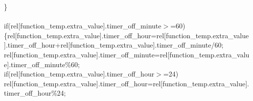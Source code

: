 \documentclass[a4paper, 12pt]{article}
\newcommand\SPC{\hspace*{0.6em}}
\newcommand{\CppAIdentifier}[1]{\textcolor[rgb]{0,1,0}{#1}}
\newcommand{\CppANumber}[1]{\textcolor[rgb]{0,0,1}{#1}}
\newcommand{\CppAReservedWord}[1]{\textcolor[rgb]{0,0.5,0}{#1}}
\newcommand{\CppASpace}[1]{\textcolor[rgb]{1,1,1}{\colorbox[rgb]{0,0,0}{#1}}}
\newcommand{\CppASymbol}[1]{\textcolor[rgb]{1,0,0}{#1}}
\begin{document}
\begin{ttfamily}
\CppASpace{\SPC \SPC }\CppASymbol{\}}\\
\\
\CppASpace{\SPC \SPC }\CppAReservedWord{if}\CppASymbol{(}\CppAIdentifier{rel}\CppASymbol{[}\CppAIdentifier{function\_temp}\CppASymbol{.}\CppAIdentifier{extra\_value}\CppASymbol{]}\CppASymbol{.}\CppAIdentifier{timer\_off\_minute}\CppASpace{\SPC }\CppASymbol{$>$=}\CppASpace{\SPC }\CppANumber{60}\CppASymbol{)}\\
\CppASpace{\SPC \SPC }\CppASymbol{\{}\CppASpace{\SPC }\CppAIdentifier{rel}\CppASymbol{[}\CppAIdentifier{function\_temp}\CppASymbol{.}\CppAIdentifier{extra\_value}\CppASymbol{]}\CppASymbol{.}\CppAIdentifier{timer\_off\_hour}\CppASpace{\SPC }\CppASymbol{=}\CppASpace{\SPC }\CppAIdentifier{rel}\CppASymbol{[}\CppAIdentifier{function\_temp}\CppASymbol{.}\CppAIdentifier{extra\_value}\CppASymbol{]}\CppASymbol{.}\CppAIdentifier{timer\_off\_hour}\CppASpace{\SPC }\CppASymbol{+}\CppASpace{\SPC }\CppAIdentifier{rel}\CppASymbol{[}\CppAIdentifier{function\_temp}\CppASymbol{.}\CppAIdentifier{extra\_value}\CppASymbol{]}\CppASymbol{.}\CppAIdentifier{timer\_off\_minute}\CppASpace{\SPC }\CppASymbol{/}\CppASpace{\SPC }\CppANumber{60}\CppASpace{\SPC }\CppASymbol{;}\\
\CppASpace{\SPC \SPC \SPC \SPC }\CppAIdentifier{rel}\CppASymbol{[}\CppAIdentifier{function\_temp}\CppASymbol{.}\CppAIdentifier{extra\_value}\CppASymbol{]}\CppASymbol{.}\CppAIdentifier{timer\_off\_minute}\CppASpace{\SPC }\CppASymbol{=}\CppASpace{\SPC }\CppAIdentifier{rel}\CppASymbol{[}\CppAIdentifier{function\_temp}\CppASymbol{.}\CppAIdentifier{extra\_value}\CppASymbol{]}\CppASymbol{.}\CppAIdentifier{timer\_off\_minute}\CppASpace{\SPC }\CppASymbol{\%}\CppASpace{\SPC }\CppANumber{60}\CppASymbol{;}\\
\CppASpace{\SPC \SPC }\CppAReservedWord{if}\CppASymbol{(}\CppAIdentifier{rel}\CppASymbol{[}\CppAIdentifier{function\_temp}\CppASymbol{.}\CppAIdentifier{extra\_value}\CppASymbol{]}\CppASymbol{.}\CppAIdentifier{timer\_off\_hour}\CppASpace{\SPC }\CppASymbol{$>$=}\CppASpace{\SPC }\CppANumber{24}\CppASymbol{)}\\
\CppASpace{\SPC \SPC }\CppAIdentifier{rel}\CppASymbol{[}\CppAIdentifier{function\_temp}\CppASymbol{.}\CppAIdentifier{extra\_value}\CppASymbol{]}\CppASymbol{.}\CppAIdentifier{timer\_off\_hour}\CppASpace{\SPC }\CppASymbol{=}\CppASpace{\SPC }\CppAIdentifier{rel}\CppASymbol{[}\CppAIdentifier{function\_temp}\CppASymbol{.}\CppAIdentifier{extra\_value}\CppASymbol{]}\CppASymbol{.}\CppAIdentifier{timer\_off\_hour}\CppASpace{\SPC }\CppASymbol{\%}\CppASpace{\SPC }\CppANumber{24}\CppASymbol{;}\\

\end{ttfamily}
\end{document}
